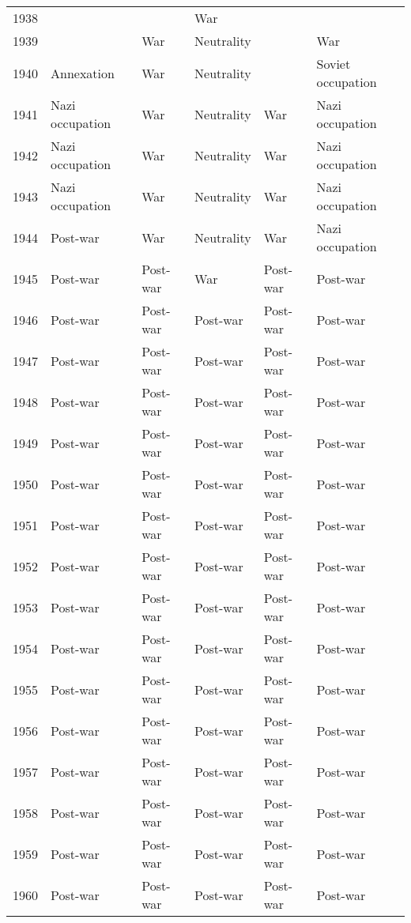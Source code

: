 \begin{table}[]
\begin{tabular}{@{}llllll@{}}
1938 &                 &          & War        &          &                   \\
1939 &                 & War      & Neutrality &          & War               \\
1940 & Annexation      & War      & Neutrality &          & Soviet occupation \\
1941 & Nazi occupation & War      & Neutrality & War      & Nazi occupation   \\
1942 & Nazi occupation & War      & Neutrality & War      & Nazi occupation   \\
1943 & Nazi occupation & War      & Neutrality & War      & Nazi occupation   \\
1944 & Post-war        & War      & Neutrality & War      & Nazi occupation   \\
1945 & Post-war        & Post-war & War        & Post-war & Post-war          \\
1946 & Post-war        & Post-war & Post-war   & Post-war & Post-war          \\
1947 & Post-war        & Post-war & Post-war   & Post-war & Post-war          \\
1948 & Post-war        & Post-war & Post-war   & Post-war & Post-war          \\
1949 & Post-war        & Post-war & Post-war   & Post-war & Post-war          \\
1950 & Post-war        & Post-war & Post-war   & Post-war & Post-war          \\
1951 & Post-war        & Post-war & Post-war   & Post-war & Post-war          \\
1952 & Post-war        & Post-war & Post-war   & Post-war & Post-war          \\
1953 & Post-war        & Post-war & Post-war   & Post-war & Post-war          \\
1954 & Post-war        & Post-war & Post-war   & Post-war & Post-war          \\
1955 & Post-war        & Post-war & Post-war   & Post-war & Post-war          \\
1956 & Post-war        & Post-war & Post-war   & Post-war & Post-war          \\
1957 & Post-war        & Post-war & Post-war   & Post-war & Post-war          \\
1958 & Post-war        & Post-war & Post-war   & Post-war & Post-war          \\
1959 & Post-war        & Post-war & Post-war   & Post-war & Post-war          \\
1960 & Post-war        & Post-war & Post-war   & Post-war & Post-war          \\ \bottomrule
\end{tabular}
\end{table}